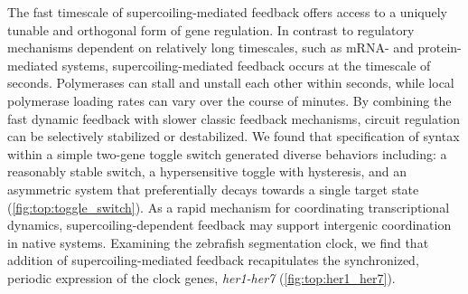 \documentclass[11pt]{article}
\begin{document}
 The fast timescale of supercoiling-mediated feedback offers access to a uniquely tunable and orthogonal form of gene regulation. In contrast to regulatory mechanisms dependent on relatively long timescales, such as mRNA- and protein-mediated systems, supercoiling-mediated feedback occurs at the timescale of seconds. Polymerases can stall and unstall each other within seconds, while local polymerase loading rates can vary over the course of minutes. By combining the fast dynamic feedback with slower classic feedback mechanisms, circuit regulation can be selectively stabilized or destabilized. We found that specification of syntax within a simple two-gene toggle switch generated diverse behaviors including: a reasonably stable switch, a hypersensitive toggle with hysteresis, and an asymmetric system that preferentially decays towards a single target state (\cref{fig:top:toggle_switch}).
As a rapid mechanism for coordinating transcriptional dynamics, supercoiling-dependent feedback may support intergenic coordination in native systems. Examining the zebrafish segmentation clock, we find that addition of supercoiling-mediated feedback recapitulates the synchronized, periodic expression of the clock genes, \textit{her1-her7} (\cref{fig:top:her1_her7}). 
\end{document}

